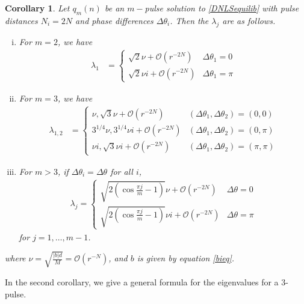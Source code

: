 \documentclass[12pt]{elsarticle}
\newtheorem{corollary}{Corollary}
\begin{document}
\begin{corollary}\label{DNLSeigcorr}Let $q_m(n)$ be an $m-$pulse solution to \eqref{DNLSequilib} with pulse distances $N_i = 2N$ and phase differences $\Delta\theta_i$. Then the $\lambda_j$ are as follows.
\begin{enumerate}[(i)]
\item For $m = 2$, we have
\begin{align}\label{2pulseeigs}
\lambda_1 &= 
\begin{cases}
\sqrt{2}\nu  + \mathcal{O}(r^{-2N}) & \Delta\theta_1 = 0 \\
\sqrt{2}\nu i + \mathcal{O}(r^{-2N}) & \Delta\theta_1 = \pi
\end{cases}
\end{align}
\item For $m = 3$, we have
\begin{align}\label{3pulseequaleigs}
\lambda_{1, 2} &= \begin{cases}
\nu, \sqrt{3} \nu + \mathcal{O}(r^{-2N}) & (\Delta\theta_1, \Delta\theta_2) = (0, 0) \\
3^{1/4}\nu, 3^{1/4}\nu i + \mathcal{O}(r^{-2N}) & (\Delta\theta_1, \Delta\theta_2) = (0, \pi) \\
\nu i, \sqrt{3} \nu i + \mathcal{O}(r^{-2N}) & (\Delta\theta_1, \Delta\theta_2) = (\pi, \pi)
\end{cases}
\end{align}
\item For $m > 3$, if $\Delta\theta_i = \Delta\theta$ for all $i$,
\begin{align*}
\lambda_j = \begin{cases}
\sqrt{2\left( \cos\frac{\pi j}{m} - 1 \right)}\nu + \mathcal{O}(r^{-2N}) & \Delta\theta = 0 \\
\sqrt{2\left( \cos\frac{\pi j}{m} - 1 \right)}\nu i + \mathcal{O}(r^{-2N}) & \Delta\theta = \pi
\end{cases}
\end{align*}
for $j = 1, \dots, m-1$.
\end{enumerate}
where $\nu = \sqrt{\frac{|b|d}{M}} = \mathcal{O}(r^{-N})$, and $b$ is given by equation \eqref{bieq}.
\end{corollary}

In the second corollary, we give a general formula for the eigenvalues for a 3-pulse.
\end{document}
